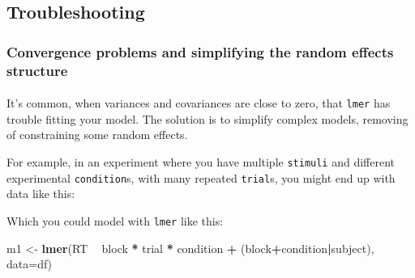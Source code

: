 \documentclass[]{article}
\newenvironment{Shaded}{\begin{snugshade}}{\end{snugshade}}
\newcommand{\KeywordTok}[1]{\textcolor[rgb]{0.13,0.29,0.53}{\textbf{#1}}}
\newcommand{\DataTypeTok}[1]{\textcolor[rgb]{0.13,0.29,0.53}{#1}}
\newcommand{\StringTok}[1]{\textcolor[rgb]{0.31,0.60,0.02}{#1}}
\newcommand{\OperatorTok}[1]{\textcolor[rgb]{0.81,0.36,0.00}{\textbf{#1}}}
\newcommand{\NormalTok}[1]{#1}
\let\oldparagraph\paragraph
\renewcommand{\paragraph}[1]{\oldparagraph{#1}\mbox{}}
\theoremstyle{definition}
\theoremstyle{definition}
\theoremstyle{definition}
\theoremstyle{remark}
\begin{document}
\subsection*{Troubleshooting}\label{troubleshooting-multilevel-models}

\subsubsection*{Convergence problems and simplifying the random effects
structure}\label{simplifying-mixed-models}

\hypertarget{controlling-lmer-covariances}{\paragraph{}\label{controlling-lmer-covariances}}

It's common, when variances and covariances are close to zero, that
\texttt{lmer} has trouble fitting your model. The solution is to
simplify complex models, removing of constraining some random effects.

For example, in an experiment where you have multiple \texttt{stimuli}
and different experimental \texttt{condition}s, with many repeated
\texttt{trial}s, you might end up with data like this:

\begin{Shaded}
\end{Shaded}

Which you could model with \texttt{lmer} like this:

\begin{Shaded}
\begin{Highlighting}[]
\NormalTok{m1 <-}\StringTok{ }\KeywordTok{lmer}\NormalTok{(RT }\OperatorTok{~}\StringTok{ }\NormalTok{block }\OperatorTok{*}\StringTok{ }\NormalTok{trial }\OperatorTok{*}\StringTok{ }\NormalTok{condition }\OperatorTok{+}\StringTok{ }\NormalTok{(block}\OperatorTok{+}\NormalTok{condition}\OperatorTok{|}\NormalTok{subject), }\DataTypeTok{data=}\NormalTok{df)}
\end{Highlighting}
\end{Shaded}
\end{document}
